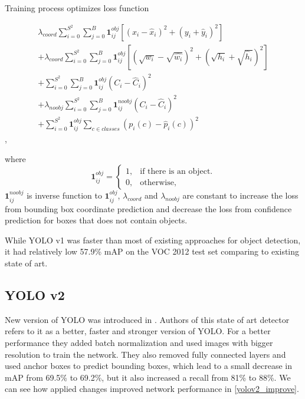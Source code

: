 \documentclass[twoside]{ctuthesis}
\theoremstyle{plain}
\theoremstyle{definition}
\theoremstyle{note}
\begin{document}
Training process optimizes loss function

\begin{multline}
\lambda_{coord}\sum_{i=0}^{S^2}\sum_{j=0}^{B}\textbf{1}_{ij}^{obj}\left[\left(x_i - \hat{x}_i\right)^2+\left(y_i + \hat{y}_i\right)^2\right]\\
+\lambda_{coord}\sum_{i=0}^{S^2}\sum_{j=0}^{B}\textbf{1}_{ij}^{obj}\left[\left(\sqrt{w_i} - \sqrt{\hat{w_i}}\right)^2+\left(\sqrt{h_i} + \sqrt{\hat{h}_i}\right)^2\right]\\
+\sum_{i=0}^{S^2}\sum_{j=0}^{B}\textbf{1}_{ij}^{obj}\left(C_i-\hat{C}_i\right)^2\\
+\lambda_{noobj}\sum_{i=0}^{S^2}\sum_{j=0}^{B}\textbf{1}_{ij}^{noobj}\left(C_i-\hat{C}_i\right)^2\\
+\sum_{i=0}^{S^2}\textbf{1}_{ij}^{obj}\sum_{c\in classes}\left(p_i(c) - \hat{p}_i(c)\right)^2
\end{multline},

where 
\begin{equation}
  \textbf{1}_{ij}^{obj}=\begin{cases}
    1, & \text{if there is an object}.\\
    0, & \text{otherwise},
  \end{cases}
\end{equation}
$\textbf{1}_{ij}^{noobj}$ is inverse function to $\textbf{1}_{ij}^{obj}$, $\lambda_{coord}$ and $\lambda_{noobj}$ are constant to increase the loss from bounding box coordinate prediction and decrease the loss from confidence prediction for boxes that does not contain objects. 

While YOLO v1 was faster than most of existing approaches for object detection, it had relatively low 57.9\% mAP on the VOC 2012 test set comparing to existing state of art. 

\subsection{YOLO v2}

New version of YOLO was introduced in \cite{redmon_farhadi_2017}. Authors of this state of art detector refers to it as a better, faster and stronger version of YOLO. For a better performance they added batch normalization and used images with bigger resolution to train the network. They also removed fully connected layers and used anchor boxes to predict bounding boxes, which lead to a small decrease in mAP from 69.5\% to 69.2\%, but it also increased a recall from 81\% to 88\%. We can see how applied changes improved network performance in \ref{yolov2_improve}.
\end{document}
